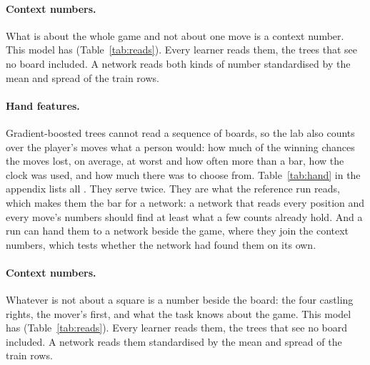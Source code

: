 \begin{table}[htbp]\centering\small
{}
\caption{The numbers of a move: what a network reads beside each position of
a row.}
\label{tab:steps}
\end{table}

\paragraph{Context numbers.}
What is about the whole game and not about one move is a context number. This
model has  (Table~\ref{tab:reads}). Every learner reads
them, the trees that see no board included. A network reads both kinds of
number standardised by the mean and spread of the train rows.

\begin{table}[htbp]\centering\small
{}
\caption{The context numbers: what every learner reads of the game itself.}
\label{tab:reads}
\end{table}

\paragraph{Hand features.}
Gradient-boosted trees cannot read a sequence of boards, so the lab also
counts over the player's moves what a person would: how much of the winning
chances the moves lost, on average, at worst and how often more than a bar,
how the clock was used, and how much there was to choose from.
Table~\ref{tab:hand} in the appendix lists all . They
serve twice. They are what the reference run reads, which makes them the bar
for a network: a network that reads every position and every move's numbers
should find at least what a few counts already hold. And a run can hand them
to a network beside the game, where they join the context numbers, which
tests whether the network had found them on its own.

\else
\paragraph{Context numbers.}
Whatever is not about a square is a number beside the board: the four castling
rights, the mover's first, and what the task knows about the game. This model
has  (Table~\ref{tab:reads}). Every learner reads them,
the trees that see no board included. A network reads them standardised by the
mean and spread of the train rows.

